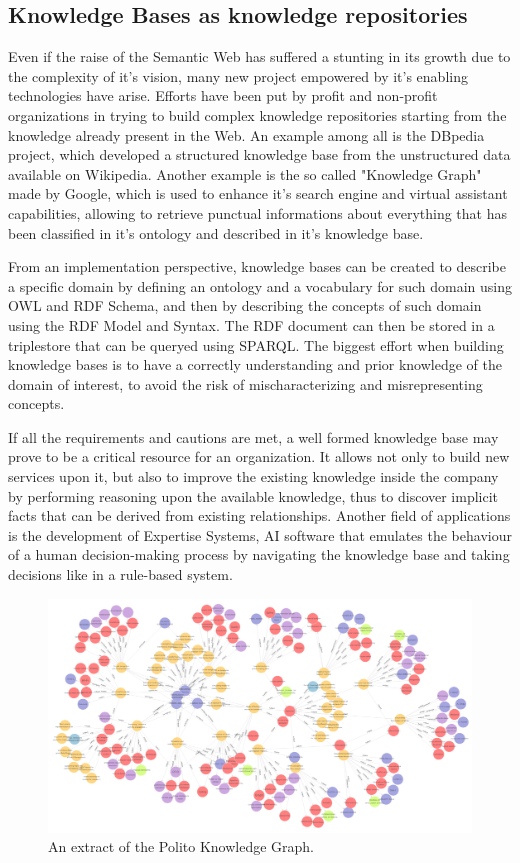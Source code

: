 \documentclass[%
    corpo=13.5pt,
    twoside,
    oldstyle,
    tipotesi=magistrale,
    greek,
    evenboxes
]{toptesi}
\begin{document}
\subsection{Knowledge Bases as knowledge repositories}

Even if the raise of the Semantic Web has suffered a stunting in its growth
due to the complexity of it's vision, many new project empowered by it's
enabling technologies have arise. Efforts have been put by profit and
non-profit organizations in trying to build complex knowledge repositories
starting from the knowledge already present in the Web. An example among all
is the DBpedia project, which developed a structured knowledge base from the
unstructured data available on Wikipedia. Another example is the so called
"Knowledge Graph" made by Google, which is used to enhance it's search engine
and virtual assistant capabilities, allowing to retrieve punctual informations
about everything that has been classified in it's ontology and described
in it's knowledge base.

From an implementation perspective, knowledge bases can be created to
describe a specific domain by defining an ontology and a vocabulary for
such domain using OWL and RDF Schema, and then by describing the concepts
of such domain using the RDF Model and Syntax. The RDF document can then be
stored in a triplestore that can be queryed using SPARQL. The biggest effort
when building knowledge bases is to have a correctly understanding and prior
knowledge of the domain of interest, to avoid the risk of mischaracterizing
and misrepresenting concepts.

If all the requirements and cautions are met, a well formed knowledge base may
prove to be a critical resource for an organization. It allows not only to
build new services upon it, but also to improve the existing knowledge inside the
company by performing reasoning upon the available knowledge, thus
to discover implicit facts that can be derived from existing relationships.
Another field of applications is the development of Expertise Systems, AI software
that emulates the behaviour of a human decision-making process by
navigating the knowledge base and taking decisions like in a rule-based system.


\begin{figure}[h]
\centering
\includegraphics[scale=0.4]{img/geranium-knowledge-base-example.png}
\caption{An extract of the Polito Knowledge Graph.}
\label{fig:geranium-knowledge-base-example}
\end{figure}
\end{document}
